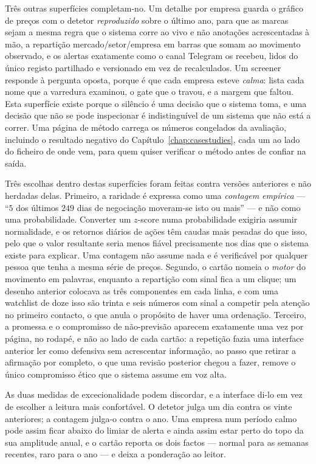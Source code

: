Três outras superfícies completam-no. Um detalhe por empresa guarda o gráfico de preços com o detetor
\emph{reproduzido} sobre o último ano, para que as marcas sejam a mesma regra que o sistema corre ao vivo
e não anotações acrescentadas à mão, a repartição mercado/setor/empresa em barras que somam ao movimento
observado, e os alertas exatamente como o canal Telegram os recebeu, lidos do único registo partilhado e
versionado em vez de recalculados. Um screener responde à pergunta oposta, porque é que cada empresa
esteve \emph{calma}: lista cada nome que a varredura examinou, o gate que o travou, e a margem que
faltou. Esta superfície existe porque o silêncio é uma decisão que o sistema toma, e uma decisão que não
se pode inspecionar é indistinguível de um sistema que não está a correr. Uma página de método carrega os
números congelados da avaliação, incluindo o resultado negativo do Capítulo~\ref{chap:casestudies}, cada
um ao lado do ficheiro de onde vem, para quem quiser verificar o método antes de confiar na saída.

Três escolhas dentro destas superfícies foram feitas contra versões anteriores e não herdadas delas.
Primeiro, a raridade é expressa como uma \emph{contagem empírica} --- ``$5$ dos últimos $249$ dias de
negociação moveram-se isto ou mais'' --- e não como uma probabilidade.
Converter um $z$-score numa probabilidade exigiria assumir normalidade, e os retornos diários de ações
têm caudas mais pesadas do que isso, pelo que o valor resultante seria menos fiável precisamente nos dias
que o sistema existe para explicar. Uma contagem não assume nada e é verificável por qualquer pessoa que
tenha a mesma série de preços. Segundo, o cartão nomeia o \emph{motor} do movimento em palavras, enquanto
a repartição com sinal fica a um clique; um desenho anterior colocava as três componentes em cada
linha, e com uma watchlist de doze isso são trinta e seis números com sinal a competir pela atenção no
primeiro contacto, o que anula o propósito de haver uma ordenação. Terceiro, a promessa e o compromisso
de não-previsão aparecem exatamente uma vez por página, no rodapé, e não ao lado de cada cartão: a
repetição fazia uma interface anterior ler como defensiva sem acrescentar informação, ao passo que
retirar a afirmação por completo, o que uma revisão posterior chegou a fazer, remove o único compromisso
ético que o sistema assume em voz alta.

As duas medidas de excecionalidade podem discordar, e a interface di-lo em vez de escolher a leitura mais
confortável. O detetor julga um dia contra os vinte anteriores; a contagem julga-o contra o ano. Uma
empresa num período calmo pode assim ficar abaixo do limiar de alerta e ainda assim estar perto do topo
da sua amplitude anual, e o cartão reporta os dois factos --- normal para as semanas recentes, raro para
o ano --- e deixa a ponderação ao leitor.

